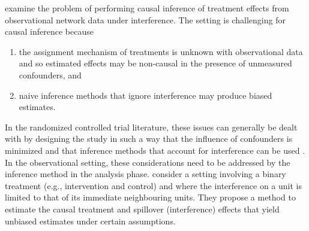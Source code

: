 \documentclass[10pt]{article}
\begin{document}
\textcite{Forastiere:2021} examine the problem of performing causal inference of treatment effects from observational network data under interference. The setting is challenging for causal inference because
\begin{enumerate}
\item
the assignment mechanism of treatments is unknown with observational data and so estimated effects may be non-causal in the presence of unmeasured confounders, and
\item
naive inference methods that ignore interference may produce biased estimates.
\end{enumerate}
In the randomized controlled trial literature, these issues can generally be dealt with by designing the study in such a way that the influence of confounders is minimized and that inference methods that account for interference can be used \parencite[e.g.,][]{Saveski:2017,Jagadeesan:2020,Imai:2021,Doudchenko:2020}. In the observational setting, these considerations need to be addressed by the inference method in the analysis phase. \citeauthor{Forastiere:2021} consider a setting involving a binary treatment (e.g., intervention and control) and where the interference on a unit is limited to that of its immediate neighbouring units. They propose a method to estimate the causal treatment and spillover (interference) effects that yield unbiased estimates under certain assumptions.
\\
\end{document}
